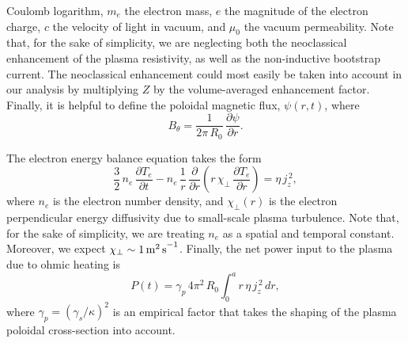 \documentclass[12pt,prb,aps]{revtex4-1}
\begin{document}
Coulomb logarithm, $m_e$ the electron mass, $e$ the magnitude of the electron charge, $c$ the velocity of light in vacuum, and
$\mu_0$ the vacuum permeability. 
Note that, for the sake of simplicity, we are neglecting both the neoclassical enhancement of the plasma resistivity, as well as 
the non-inductive bootstrap current.\cite{fitz1} The neoclassical  enhancement could most easily be taken into account in our analysis by multiplying $Z$
 by the volume-averaged enhancement factor. 
 Finally, it is helpful to define the poloidal magnetic flux, $\psi(r,t)$, where 
\begin{equation}
B_\theta =  \frac{1}{2\pi\,R_0}\,\frac{\partial\psi}{\partial r}.
\end{equation}

The electron energy balance equation takes the form\,\cite{fitz}
\begin{equation}
\frac{3}{2}\,n_e\,\frac{\partial T_e}{\partial t} - n_e\,\frac{1}{r}\,\frac{\partial}{\partial r}\left(r\,\chi_\perp\,\frac{\partial T_e}{\partial r}\right)
 = \eta\,j_z^{\,2},
 \end{equation}
 where $n_e$ is the electron number density, and $\chi_\perp(r)$ is the electron perpendicular energy diffusivity due to small-scale plasma turbulence. 
 Note that, for the sake of simplicity, we are treating $n_e$ as a spatial and temporal constant. Moreover, we expect $\chi_\perp \sim 1\,{\rm m^2\,s}^{-1}$.\cite{book}
 Finally, the net power input to the plasma due to ohmic heating is
 \begin{equation}
 P(t) = \gamma_p\,4\pi^2\,R_0\int_0^a r\,\eta\,j_z^{\,2}\,dr,
 \end{equation}
 where $\gamma_p= (\gamma_s/\kappa)^2$ is an empirical factor that takes the shaping of the plasma poloidal cross-section into account.\cite{uckam}
 
\end{document}
